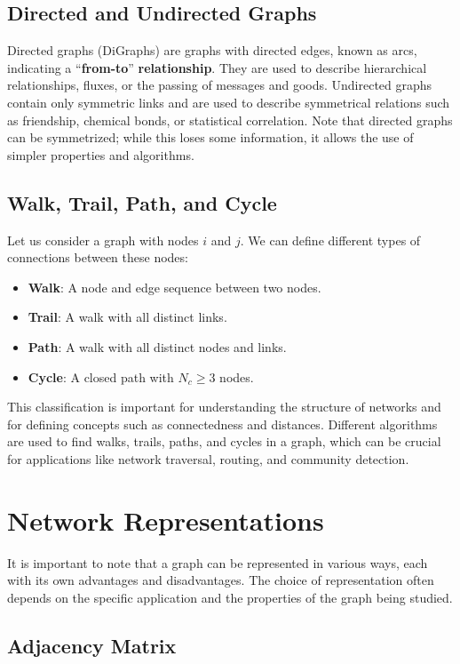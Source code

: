 \subsection{Directed and Undirected Graphs}
Directed graphs (DiGraphs) are graphs with directed edges, known as arcs, indicating a ``\textbf{from-to}'' \textbf{relationship}. They are used to describe hierarchical relationships, fluxes, or the passing of messages and goods. Undirected graphs contain only symmetric links and are used to describe symmetrical relations such as friendship, chemical bonds, or statistical correlation. Note that directed graphs can be symmetrized; while this loses some information, it allows the use of simpler properties and algorithms.

\subsection{Walk, Trail, Path, and Cycle}

Let us consider a graph with nodes $i$ and $j$. We can define different types of connections between these nodes:
\begin{itemize}
    \item \textbf{Walk}: A node and edge sequence between two nodes.
    \item \textbf{Trail}: A walk with all distinct links.
    \item \textbf{Path}: A walk with all distinct nodes and links.
    \item \textbf{Cycle}: A closed path with $N_c \ge 3$ nodes.
\end{itemize}
This classification is important for understanding the structure of networks and for defining concepts such as connectedness and distances. Different algorithms are used to find walks, trails, paths, and cycles in a graph, which can be crucial for applications like network traversal, routing, and community detection.

\section{Network Representations}

It is important to note that a graph can be represented in various ways, each with its own advantages and disadvantages. The choice of representation often depends on the specific application and the properties of the graph being studied.

\subsection{Adjacency Matrix}

